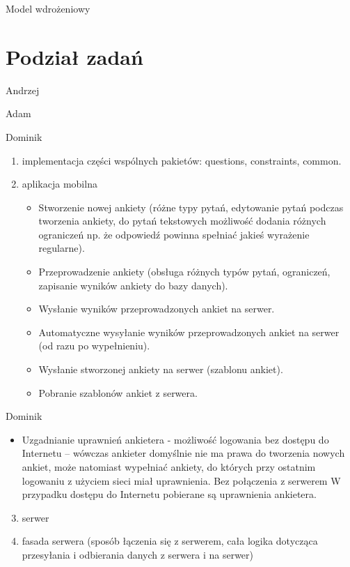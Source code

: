 \documentclass[a4paper,10pt]{beamer}
\begin{document}
		\begin{frame}{Model wdrożeniowy}
			
		\end{frame}
		
		\section{Podział zadań}
		
		\begin{frame}{Andrzej}
			
		\end{frame}
		
		\begin{frame}{Adam}
			
		\end{frame}
		
		\begin{frame}{Dominik}
			\begin{enumerate}
				\item	implementacja części wspólnych pakietów: questions, constraints, common.
				\item	aplikacja mobilna
				\begin{itemize}
					\item Stworzenie nowej ankiety (różne typy pytań, edytowanie pytań podczas tworzenia ankiety, do pytań tekstowych możliwość dodania różnych ograniczeń np. że odpowiedź powinna spełniać jakieś wyrażenie regularne).
					\item	Przeprowadzenie ankiety (obsługa różnych typów pytań, ograniczeń, zapisanie wyników ankiety do bazy danych).
					\item	Wysłanie wyników przeprowadzonych ankiet na serwer.
					\item	Automatyczne wysyłanie wyników przeprowadzonych ankiet na serwer (od razu po wypełnieniu).
					\item	Wysłanie stworzonej ankiety na serwer (szablonu ankiet).
					\item	Pobranie szablonów ankiet z serwera.
				\end{itemize}
			\end{enumerate}
		\end{frame}
		\begin{frame}{Dominik}
				\begin{itemize}
					\item	Uzgadnianie uprawnień ankietera - możliwość logowania bez dostępu do Internetu – wówczas ankieter domyślnie nie ma prawa do tworzenia nowych ankiet, może natomiast wypełniać ankiety, do których przy ostatnim logowaniu z użyciem sieci miał uprawnienia. Bez połączenia z serwerem  W przypadku dostępu do Internetu pobierane są uprawnienia ankietera.
				\end{itemize}
		\begin{enumerate}
			\setcounter{enumi}{2}	
				\item	serwer
				\item	fasada serwera (sposób łączenia się z serwerem, cała logika dotycząca przesyłania i odbierania danych z serwera i na serwer)
		\end{enumerate}
		\end{frame}
\end{document}
